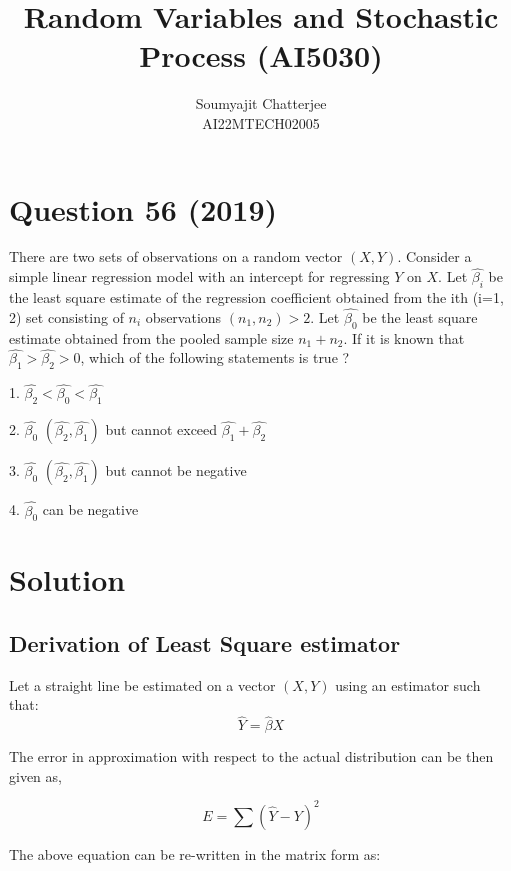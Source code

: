 \documentclass[12pt]{article}
\title{Random Variables and Stochastic Process (AI5030)}
\author{Soumyajit Chatterjee\\AI22MTECH02005 }
\begin{document}
\maketitle

\section*{Question 56 (2019)}
There are two sets of observations on a random vector $(X,Y)$. Consider a simple linear regression model with an intercept for regressing $Y$ on $X$. Let $\hat{\beta_i}$ be the least square estimate of the regression coefficient obtained from the ith (i=1, 2) set consisting of $n_i$ observations $(n_1, n_2) > 2$. Let $\hat{\beta_0}$ be the least square  estimate obtained from the pooled sample size $n_1+n_2$. If it is known that $\hat{\beta_1} > \hat{\beta_2} > 0$, which of the following statements is true ?
\vspace{1cm}

1. $\hat{\beta_2} < \hat{\beta_0} < \hat{\beta_1}$

2. $\hat{\beta_0}$  $(\hat{\beta_2}, \hat{\beta_1})$ but cannot exceed $\hat{\beta_1} + \hat{\beta_2}$

3. $\hat{\beta_0}$  $(\hat{\beta_2}, \hat{\beta_1})$ but cannot be negative

4. $\hat{\beta_0}$ can be negative
\vspace{1cm}

\section*{Solution}

\subsection*{Derivation of Least Square estimator}

Let a straight line be estimated on a vector $(X,Y)$ using an estimator such that:
\begin{equation}
\hat{Y} = \hat{\beta} X
\end{equation}

\noindent The error in approximation with respect to the actual distribution can be then given as,

\begin{equation}
E = \sum (\hat{Y} -Y)^2
\end{equation}

\noindent The above equation can be re-written in the matrix form as:
\end{document}
